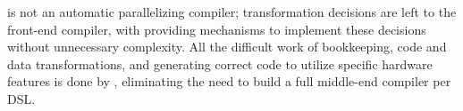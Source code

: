 
\framework{} is not an automatic parallelizing compiler; transformation decisions are left to the front-end compiler, with \framework{} providing mechanisms to implement these decisions without unnecessary complexity.
All the difficult work of bookkeeping, code and data transformations, and generating correct code to utilize specific hardware features is done by \framework{}, eliminating the need to build a full middle-end compiler per DSL.

